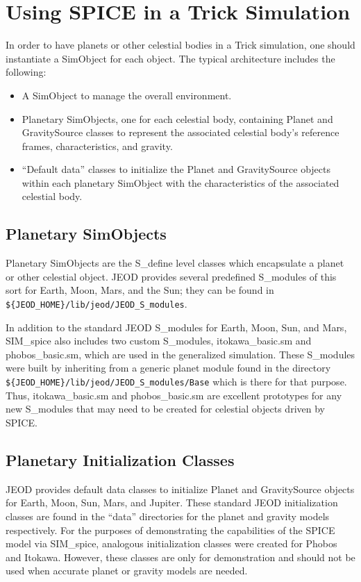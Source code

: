 \section{Using SPICE in a Trick Simulation}\label{sec:builder}
In order to have planets or other celestial bodies in a Trick simulation,
one should instantiate a SimObject for each object. The typical architecture
includes the following:
\begin{itemize}
\item A SimObject to manage the overall environment.
\item Planetary SimObjects, one for each celestial body, containing Planet
and GravitySource classes to represent the associated celestial body's reference
frames, characteristics, and gravity.
\item ``Default data'' classes to initialize the Planet and GravitySource objects
within each planetary SimObject with the characteristics of the associated
celestial body.
\end{itemize}


\subsection{Planetary SimObjects}\label{subsec:planet.sm}
Planetary SimObjects are the S\_define level classes which encapsulate a planet
or other celestial object. JEOD provides several predefined S\_modules of this
sort for Earth, Moon, Mars, and the Sun; they can be found in
\verb|${JEOD_HOME}/lib/jeod/JEOD_S_modules|.

In addition to the standard JEOD S\_modules for Earth, Moon, Sun, and Mars,
SIM\_spice also includes two custom S\_modules, itokawa\_basic.sm and
phobos\_basic.sm, which are used in the generalized simulation. These
S\_modules were built by inheriting from a generic planet module found
in the directory \verb|${JEOD_HOME}/lib/jeod/JEOD_S_modules/Base| which is
there for that purpose. Thus, itokawa\_basic.sm and phobos\_basic.sm
are excellent prototypes for any new S\_modules that may need to be created
for celestial objects driven by SPICE.


\subsection{Planetary Initialization Classes}\label{subsec:planetary_init}
JEOD provides default data classes to initialize Planet and GravitySource
objects for Earth, Moon, Sun, Mars, and Jupiter. These standard JEOD
initialization classes are found in the ``data'' directories for the planet
and gravity models respectively.  For the purposes of demonstrating the
capabilities of the SPICE model via SIM\_spice, analogous initialization
classes were created for Phobos and Itokawa.  However, these classes are
only for demonstration and should not be used when accurate planet or gravity
models are needed.


